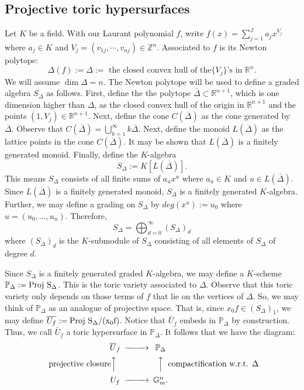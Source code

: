 \documentclass[a4paper,oneside,11pt]{article}
\theoremstyle{plain} \theoremstyle{definition}
\theoremstyle{remark}
\def\bb #1{ {\mathbb #1} }
\newcommand{\Z}{\mathbb{Z}}
\newcommand{\R}{\mathbb{R}}
\begin{document}
\subsection{Projective toric hypersurfaces}\label{Ss: toric}
Let $K$ be a field. With our Laurant polynomial $f$, write $f(x) =
\sum_{j=1}^J a_j x^{V_j}$ where $a_j \in K$ and
$V_j=(v_{1j},\cdots,v_{nj}) \in \Z^n$. Associated to $f$ is its
Newton polytope:
\[
\Delta(f) := \Delta := \text{ the closed convex hull of the
$\{V_j\}$'s in $\R^n$}.
\]
We will assume $\dim \Delta=n$. The Newton polytope will be used
to define a graded algebra $S_\Delta$ as follows. First, define
the the polytope $\bar \Delta \subset \bb R^{n+1}$, which is one
dimension higher than $\Delta$, as the closed convex hull of the
origin in $\bb R^{n+1}$ and the points $(1,V_j) \in \R^{n+1}$.
Next, define the cone $C(\overline{\Delta})$ as the cone generated
by $\overline{\Delta}$. Observe that $C(\bar \Delta) =
\bigcup_{k=1}^\infty k\overline{\Delta}$. Next, define the monoid
$L(\overline{\Delta})$ as the lattice points in the cone
$C(\overline{\Delta})$. It may be shown that $L(\bar \Delta)$ is a
finitely generated monoid. Finally, define the $K$-algebra
\[
S_\Delta := K[L(\overline{\Delta})].
\]
This means $S_\Delta$ consists of all finite sums of $a_u x^u$
where $a_u \in K$ and $u \in L(\bar \Delta)$. Since $L(\bar
\Delta)$ is a finitely generated monoid, $S_\Delta$ is a finitely
generated $K$-algebra. Further, we may define a grading on
$S_\Delta$ by $deg(x^u) := u_0$ where $u = (u_0, \ldots, u_n)$.
Therefore,
\[
S_{\Delta} = \bigoplus_{d=0}^\infty (S_\Delta)_d
\]
where $(S_\Delta)_d$ is the $K$-submodule of $S_\Delta$ consisting
of all elements of $S_\Delta$ of degree $d$.

Since $S_\Delta$ is a finitely generated graded $K$-algebra, we
may define a $K$-scheme $\bb P_\Delta := \rm{Proj\ } S_\Delta$.
This is the toric variety associated to $\Delta$. Observe that
this toric variety only depends on those terms of $f$ that lie on
the vertices of $\Delta$. So, we may think of $\bb P_\Delta$ as an
analogue of projective space. That is, since $x_0 f \in
(S_\Delta)_1$, we may define $\overline{U_f} := \rm{Proj\ }
S_\Delta/(x_0f)$. Notice that $\bar U_f$ embeds in $\bb P_\Delta$
by construction. Thus, we call $\bar U_f$ a toric hypersurface in
$\bb P_\Delta$. It follows that we have the diagram:
$$ \begin{CD}
\hskip 28mm \overline{U}_f @> >> \mathbb{P}_{\Delta}\\
\text{projective closure}@AA  A @A  AA \text{compactification w.r.t. $\Delta$}\\
\hskip 28mm U_f @> >> \mathbb{G}_m^n.
\end{CD} $$
\end{document}
